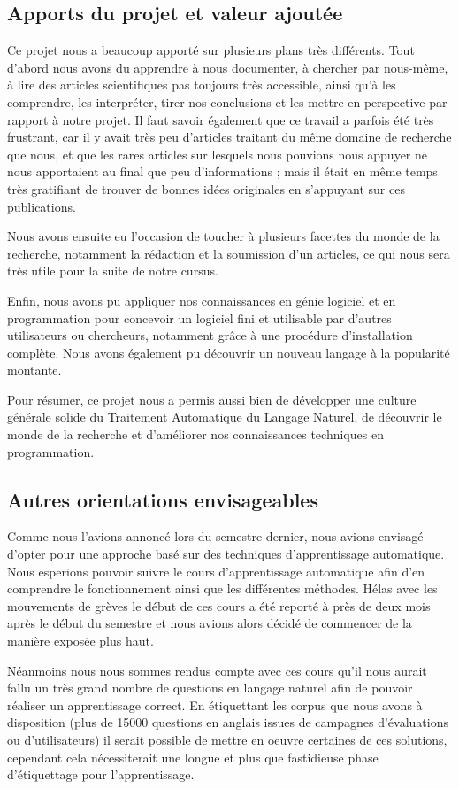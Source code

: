 \documentclass[10pt,a4paper]{article}
\begin{document}
\subsection{Apports du projet et valeur ajoutée}
\par Ce projet nous a beaucoup apporté sur plusieurs plans très différents. Tout d'abord nous avons du apprendre à nous documenter, à chercher par nous-même, à lire des articles scientifiques pas toujours très accessible, ainsi qu'à les comprendre, les interpréter, tirer nos conclusions et les mettre en perspective par rapport à notre projet. Il faut savoir également que ce travail a parfois été très frustrant, car il y avait très peu d'articles traitant du même domaine de recherche que nous, et que les rares articles sur lesquels nous pouvions nous appuyer ne nous apportaient au final que peu d'informations ; mais il était en même temps très gratifiant de trouver de bonnes idées originales en s'appuyant sur ces publications.
\par Nous avons ensuite eu l'occasion de toucher à plusieurs facettes du monde de la recherche, notamment la rédaction et la soumission d'un articles, ce qui nous sera très utile pour la suite de notre cursus. 
\par Enfin, nous avons pu appliquer nos connaissances en génie logiciel et en programmation pour concevoir un logiciel fini et utilisable par d'autres utilisateurs ou chercheurs, notamment grâce à une procédure d'installation complète. Nous avons également pu découvrir un nouveau langage à la popularité montante.
\par Pour résumer, ce projet nous a permis aussi bien de développer une culture générale solide du Traitement Automatique du Langage Naturel, de découvrir le monde de la recherche et d'améliorer nos connaissances techniques en programmation.
\subsection{Autres orientations envisageables}
\par Comme nous l'avions annoncé lors du semestre dernier, nous avions envisagé d'opter pour une approche basé sur des techniques d'apprentissage automatique. Nous esperions pouvoir suivre le cours d'apprentissage automatique afin d'en comprendre le fonctionnement ainsi que les différentes méthodes. Hélas avec les mouvements de grèves le début de ces cours a été reporté à près de deux mois après le début du semestre et nous avions alors décidé de commencer de la manière exposée plus haut. 
\par Néanmoins nous nous sommes rendus compte avec ces cours qu'il nous aurait fallu un très grand nombre de questions en langage naturel afin de pouvoir réaliser un apprentissage correct. En étiquettant les corpus que nous avons à disposition (plus de 15000 questions en anglais issues de campagnes d'évaluations ou d'utilisateurs) il serait possible de mettre en oeuvre certaines de ces solutions, cependant cela nécessiterait une longue et plus que fastidieuse phase d'étiquettage pour l'apprentissage.
\end{document}
